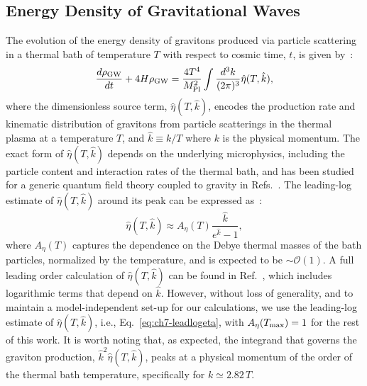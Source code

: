 \subsection{Energy Density of Gravitational Waves}
The evolution of the energy density of gravitons produced via particle scattering in a thermal bath of temperature $T$ with respect to cosmic time, $t$, is given by~\cite{Ghiglieri:2015nfa,Ghiglieri:2020mhm}:
\begin{eqnarray}
\frac{d \rho_{\rm GW}}{d t}+4H\rho_{\rm GW}=\frac{4T^4}{M^2_{\rm Pl}}\int \frac{d^3k}{(2\pi)^3}\hat{\eta}(T,\hat k),
\label{eq:ch7-rhoGW_1}
\end{eqnarray}
where the dimensionless source term, $\hat{\eta}(T,\hat{k})$, encodes the production rate and kinematic distribution of gravitons from particle scatterings in the thermal plasma at a temperature $T$, and $\hat{k}\equiv k/T$ where $k$ is the physical momentum. The exact form of $\hat \eta(T, \hat k)$ depends on the underlying microphysics, including the particle content and interaction rates of the thermal bath, and has been studied for a generic quantum field theory coupled to gravity in Refs.~\cite{Ghiglieri:2015nfa,Ghiglieri:2020mhm,Ringwald:2020ist}. The leading-log estimate of $\hat{\eta}(T,\hat{k})$ around its peak can be expressed as~\cite{Ghiglieri:2015nfa,Ringwald:2020ist}:
\begin{equation}
    \hat \eta (T, \hat k)\approx A_{\eta}(T)\frac{\hat k}{e^{\hat k}-1},
    \label{eq:ch7-leadlogeta}
\end{equation}
where $A_{\eta}(T)$ captures the dependence on the Debye thermal masses of the bath particles, normalized by the temperature, and is expected to be $\sim \mathcal{O}(1)$. A full leading order calculation of $\hat{\eta}(T,\hat{k})$ can be found in Ref.~\cite{Ghiglieri:2020mhm}, which includes logarithmic terms that depend on $\hat k$. However, without loss of generality, and to maintain a model-independent set-up for our calculations, we use the leading-log estimate of $\hat{\eta}(T,\hat{k})$, i.e., Eq.~\eqref{eq:ch7-leadlogeta}, with $A_{\eta}(T_{\rm max})=1$ for the rest of this work. It is worth noting that, as expected, the integrand that governs the graviton production, $\hat k^2 \hat\eta(T,\hat k)$, peaks at a physical momentum of the order of the thermal bath temperature, specifically for $k\simeq 2.82\, T$.

